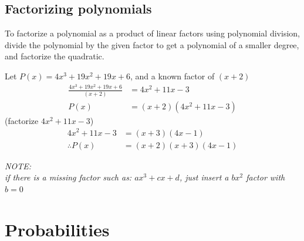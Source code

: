 \documentclass{book}
\newenvironment{note}{\begin{center}\em NOTE:\\}{\end{center}}
\begin{document}
\section{Factorizing polynomials}
To factorize a polynomial as a product of linear factors using polynomial division, divide the polynomial by the given factor to get a polynomial of a smaller degree, and factorize the quadratic.
\begin{center}
	Let $P(x) = 4x^3 + 19x^2 + 19x + 6$, and a known factor of $(x + 2)$
	\begin{align*}
		\frac{4x^3 + 19x^2 + 19x + 6}{(x + 2)} & = 4x^2 + 11x - 3          \\
		P(x)                                   & = (x + 2)(4x^2 + 11x - 3)
	\end{align*}
	(factorize $4x^2 + 11x - 3$)
	\begin{align*}
		4x^2 + 11x - 3  & = (x + 3)(4x - 1)        \\
		\therefore P(x) & = (x + 2)(x + 3)(4x - 1)
	\end{align*}
\end{center}

\begin{note}
	if there is a missing factor such as: $ax^3 + cx + d$, just insert a $bx^2$ factor with $b = 0$
\end{note}

\chapter{Probabilities}
\end{document}
